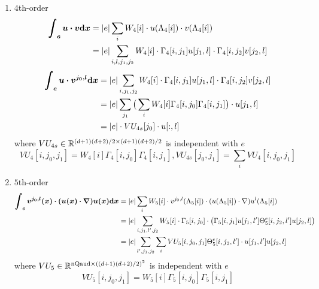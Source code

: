 \begin{enumerate}
  \item $4$th-order
    \begin{equation}\label{eq:integral-uv}
      \begin{split}
        \bm{\int_e u\cdot v\mathrm{d} x} &= |e| \sum_i W_4[i]
        \cdot u(\Lambda_4[i])\cdot v(\Lambda_4[i]) \\
        &= |e|\sum_{i,l,j_1,j_2}W_4[i]\cdot\Gamma_4[i,j_1]u[j_1,l]
        \cdot \Gamma_4[i,j_2]v[j_2,l]
      \end{split}
    \end{equation}
    \[
      \begin{split}
        \bm{\int_e u\cdot v^{j_0,l}\mathrm{d} x} &= |e| \sum_{i,j_1,j_2} W_4[i]
        \cdot\Gamma_4[i,j_1]u[j_1,l]\cdot\Gamma_4[i,j_2]v[j_2,l] \\
        &= |e|\sum_{j_1}\big(\sum_{i} W_4[i]\Gamma_4[i,j_0]\Gamma_4[i,j_1]\big) 
        \cdot u[j_1,l] \\
        &= |e| \cdot VU_{4s}[j_0]\cdot u[:,l]
      \end{split}
    \]
    where $VU_{4s}\in\mathbb{R}^{(d+1)(d+2)/2\times(d+1)(d+2)/2}$ is independent with $e$
    \[
      VU_4[i,j_0,j_1]=W_4[i]\Gamma_4[i,j_0]\Gamma_4[i,j_1],
      VU_{4s}[j_0,j_1]=\sum_iVU_4[i,j_0,j_1]
    \]

  \item $5$th-order
    \[
      \begin{split}
        \bm{\int_e v^{j_0,l}(x)\cdot(u(x)\cdot\nabla)u(x)\mathrm{d} x}
        &= |e|\sum_i W_5[i]\cdot v^{j_0,l}(\Lambda_5[i]) \cdot 
        (u(\Lambda_5[i])\cdot\nabla)u^l(\Lambda_5[i]) \\
        &= |e|\sum_{i,j_1,l',j_2} W_5[i] \cdot \Gamma_5[i,j_0] \cdot 
        \big(\Gamma_5[i,j_1]u[j_1,l']\Theta_5^e[i,j_2,l']u[j_2,l]\big) \\
        &= |e|\sum_{l',j_1,j_2}\sum_iVU_5[i,j_0,j_1]\Theta_5^e[i,j_2,l']\cdot 
        u[j_1,l']u[j_2,l]
      \end{split}
    \]
    where $VU_5\in\mathbb{R}^{\text{nQaud}\times((d+1)(d+2)/2)^2}$ is independent with $e$
    \[VU_5[i,j_0,j_1]=W_5[i]\Gamma_5[i,j_0]\Gamma_5[i,j_1]\]


\end{enumerate}
